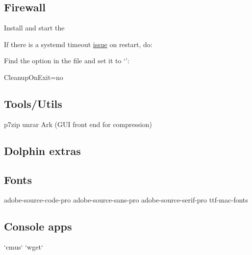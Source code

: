 
\subsection{Firewall}

Install  and start the 

If there is a systemd timeout \href{https://bugzilla.redhat.com/show_bug.cgi?id=1294415#c10}{issue} on restart, do:

\begin{blocksection}
	Find the  option in the file and set it to `':\\
	\begin{codeblock}
		CleanupOnExit=no
	\end{codeblock}
\end{blocksection}

\subsection{Tools/Utils}

p7zip
unrar
Ark (GUI front end for compression)

\subsection{Dolphin extras}


\subsection{Fonts}

adobe-source-code-pro
adobe-source-sans-pro
adobe-source-serif-pro
ttf-mac-fonts

\subsection{Console apps}

`cmus`
`wget`

